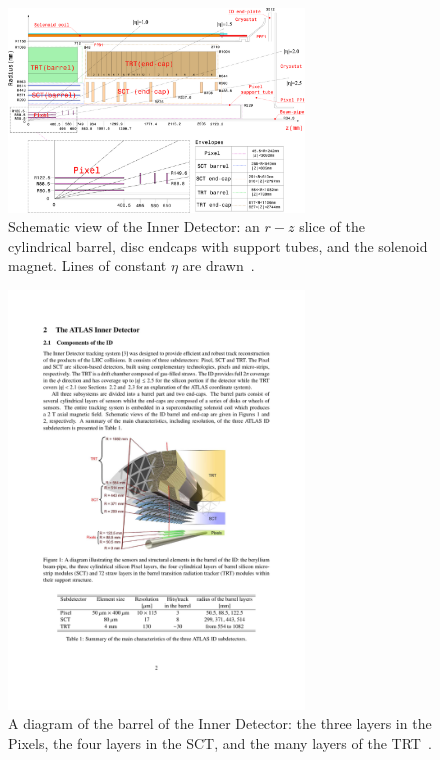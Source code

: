 \begin{figure}[tp]
  \centering
  \includegraphics[width=0.7\textwidth]{fig/atlas/id-schem}
  \caption{Schematic view of the Inner Detector: an $r-z$ slice of the cylindrical barrel, disc endcaps with support tubes, and the solenoid magnet. Lines of constant $\eta$ are drawn~\cite{cern-jinst-atlas}.}
  \label{fig:id-scheme}
\end{figure}
\begin{figure}[tp]
  \centering
  \includegraphics[width=0.7\textwidth]{fig/atlas/id-barrel}
  \caption{A diagram of the barrel of the Inner Detector: the three layers in the Pixels, the four layers in the SCT, and the many layers of the TRT~\cite{cern-jinst-atlas}.}
  \label{fig:id-barrel}
\end{figure}
